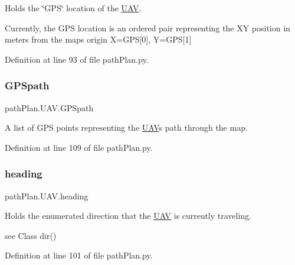 Holds the \char`\"{}\+G\+P\+S\char`\"{} location of the \mbox{\hyperlink{classpath_plan_1_1_u_a_v}{U\+AV}}. 

Currently, the G\+PS location is an ordered pair representing the XY position in meters from the map\textquotesingle{}s origin X=G\+PS\mbox{[}0\mbox{]}, Y=G\+PS\mbox{[}1\mbox{]} 

Definition at line 93 of file path\+Plan.\+py.

\mbox{\label{classpath_plan_1_1_u_a_v_a1d6d4797e8ac522de0da65ba882b8616}} 
\subsubsection{\texorpdfstring{G\+P\+Spath}{GPSpath}}
{\footnotesize\ttfamily path\+Plan.\+U\+A\+V.\+G\+P\+Spath}



A list of G\+PS points representing the \mbox{\hyperlink{classpath_plan_1_1_u_a_v}{U\+AV}}\textquotesingle{}s path through the map. 



Definition at line 109 of file path\+Plan.\+py.

\mbox{\label{classpath_plan_1_1_u_a_v_ac49fa37a2aaf8fe987f1500069c4f903}} 
\subsubsection{\texorpdfstring{heading}{heading}}
{\footnotesize\ttfamily path\+Plan.\+U\+A\+V.\+heading}



Holds the enumerated direction that the \mbox{\hyperlink{classpath_plan_1_1_u_a_v}{U\+AV}} is currently traveling. 

see Class dir() 

Definition at line 101 of file path\+Plan.\+py.

\mbox{\label{classpath_plan_1_1_u_a_v_a8c6578c4b96f4704489038660a4ebe58}} 
